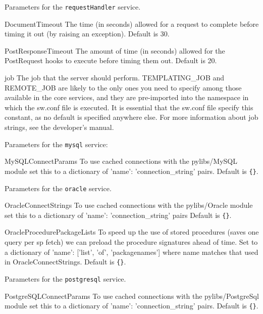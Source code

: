 \documentclass[titlepage]{manual}
\begin{document}
Parameters for the \texttt{requestHandler} service.
\begin{argdesc}
\item[DocumentTimeout]
The time (in seconds) allowed for a request to complete before timing
it out (by raising an exception).
Default is 30.
\item[PostResponseTimeout]
The amount of time (in seconds) allowed for the PostRequest hooks to
execute before timing them out.
Default is 20.
\item[job] 
The job that the server should perform.  TEMPLATING_JOB and REMOTE_JOB 
are likely to the only ones you need to specify among those available in
the core services, and they are pre-imported into the namespace in which
the sw.conf file is executed.  It is essential that the sw.conf file
specify this constant, as no default is specified anywhere else.
For more information about job strings, see the developer's manual.
\end{argdesc}



Parameters for the \texttt{mysql} service:
\begin{argdesc}
\item[MySQLConnectParams] \nonscope
To use cached connections with the pylibs/MySQL module set this to
a dictionary of 'name': 'connection\_string' pairs.
Default is \texttt{\{\}}.
\end{argdesc}


Parameters for the \texttt{oracle} service.
\begin{argdesc}
\item[OracleConnectStrings]  \nonscope
To use cached connections with the pylibs/Oracle module set this to
a dictionary of 'name': 'connection\_string' pairs
Default is \texttt{\{\}}.
\item[OracleProcedurePackageLists] \nonscope
To speed up the use of stored procedures (saves one query per sp fetch)
we can preload the procedure signatures ahead of time.
Set to a dictionary of 'name': ['list', 'of', 'packagenames'] where name
matches that used in OracleConnectStrings.
Default is \texttt{\{\}}.
\end{argdesc}

Parameters for the \texttt{postgresql} service.
\begin{argdesc}
\item[PostgreSQLConnectParams] \nonscope
To use cached connections with the pylibs/PostgreSql module set this to
a dictionary of 'name': 'connection\_string' pairs.
Default is \texttt{\{\}}.
\end{argdesc}
\end{document}
